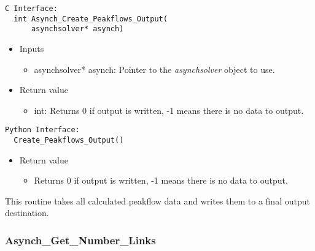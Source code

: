 \documentclass[12pt]{article}
\begin{document}
\begin{lstlisting}[style=CStyle]
  C Interface:
  int Asynch_Create_Peakflows_Output(
      asynchsolver* asynch)
\end{lstlisting}
\begin{itemize}
 \item Inputs
  \begin{itemize}
   \item asynchsolver* asynch: Pointer to the \emph{asynchsolver} object to use.
  \end{itemize}
 \item Return value
  \begin{itemize}
   \item int: Returns 0 if output is written, -1 means there is no data to output.
  \end{itemize}
\end{itemize}
\begin{lstlisting}[style=PythonStyle]
  Python Interface:
  Create_Peakflows_Output()
\end{lstlisting}
\begin{itemize}
 \item Return value
  \begin{itemize}
   \item Returns 0 if output is written, -1 means there is no data to output.
  \end{itemize}
\end{itemize}
This routine takes all calculated peakflow data and writes them to a final output destination.


\subsubsection{Asynch\_Get\_Number\_Links} \label{sec: asynch_get_number_links}
\end{document}
